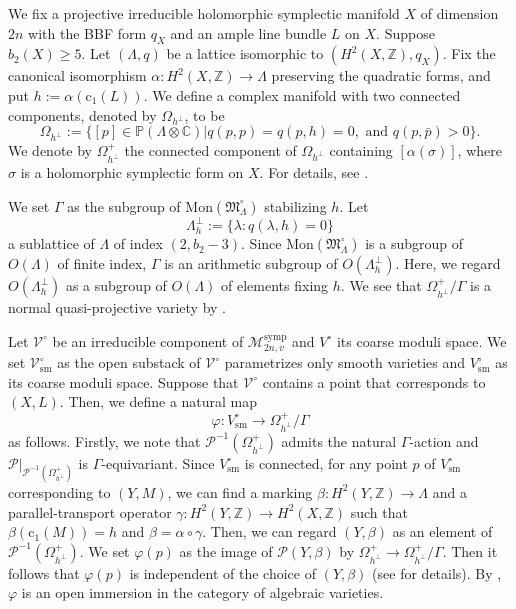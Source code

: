 \documentclass[12pt,twoside]{amsart}
\theoremstyle{definition}
\begin{document}
 We fix a projective irreducible holomorphic symplectic manifold $X$ of dimension $2n$ with the BBF form $q_X$ and an ample line bundle $L$ on $X$. 
 Suppose $b_2(X)\ge 5$.
Let $(\Lambda,q)$ be a lattice isomorphic to $(H^2(X,\mathbb{Z}),q_X)$. 
Fix the canonical isomorphism $\alpha\colon H^2(X,\mathbb{Z})\to \Lambda$ preserving the quadratic forms, and put $h:=\alpha(\mathrm{c}_1(L))$.
We define a complex manifold with two connected components, denoted by $\Omega_{h^{\perp}}$, to be
\[
\Omega_{h^{\perp}}:=\{[p]\in\mathbb{P}(\Lambda\otimes\mathbb{C})|q(p,p)=q(p,h)=0, \textrm{ and }q(p,\bar{p})>0\}.
\]
We denote by $\Omega_{h^{\perp}}^+$ the connected component of $\Omega_{h^{\perp}}$ containing $[\alpha(\sigma)]$, where $\sigma$ is a holomorphic symplectic form on $X$.  
For details, see \cite[\S4]{MarkmanSurvey}.
 
We set $\Gamma$ as the subgroup of $\mathrm{Mon}(\mathfrak{M}_{\Lambda}^\circ)$ stabilizing $h$. 
 Let 
 \[
 \Lambda_h^\perp:=\{\lambda: q(\lambda,h)=0\}
 \]
 a sublattice of $\Lambda$ of index $(2,b_2-3)$.
 Since $\mathrm{Mon}(\mathfrak{M}_{\Lambda}^\circ)$ is a subgroup of $O(\Lambda)$ of finite index, $\Gamma$ is an arithmetic subgroup of $O(\Lambda_h^\perp)$.
 Here, we regard $O(\Lambda_h^\perp)$ as a subgroup of $O(\Lambda)$ of elements fixing $h$.
 We see that $\Omega_{h^{\perp}}^+/\Gamma$ is a normal quasi-projective variety by \cite{BB}. 
 
Let $\mathcal{V}^\circ$ be an irreducible component of $\mathcal{M}^{\mathrm{symp}}_{2n,v}$ and $V^\circ$ its coarse moduli space.
We set $\mathcal{V}^\circ_{\mathrm{sm}}$ as the open substack of $\mathcal{V}^\circ$ parametrizes only smooth varieties and $V^\circ_{\mathrm{sm}}$ as its coarse moduli space.
Suppose that $\mathcal{V}^\circ$ contains a point that corresponds to $(X,L)$.
 Then, we define a natural map 
 \[
\varphi\colon V^\circ_{\mathrm{sm}}\to \Omega_{h^{\perp}}^+/\Gamma
 \]
as follows.  Firstly, we note that $\mathcal{P}^{-1}(\Omega_{h^\perp}^+)$ admits the natural $\Gamma$-action and $\mathcal{P}|_{\mathcal{P}^{-1}(\Omega_{h^\perp}^+)}$ is $\Gamma$-equivariant.
 Since $V^\circ_{\mathrm{sm}}$ is connected, for any point $p$ of $V^\circ_{\mathrm{sm}}$ corresponding to $(Y,M)$, we can find a marking $\beta\colon H^2(Y,\mathbb{Z})\to \Lambda$ and a parallel-transport operator $\gamma\colon H^2(Y,\mathbb{Z})\to H^2(X,\mathbb{Z})$ such that $\beta(\mathrm{c}_1(M))=h$ and $\beta=\alpha \circ \gamma$.
 Then, we can regard $(Y,\beta)$ as an element of $\mathcal{P}^{-1}(\Omega_{h^\perp}^+)$. 
 We set $\varphi(p)$ as the image of $\mathcal{P}(Y,\beta)$ by $\Omega_{h^{\perp}}^+\to\Omega_{h^{\perp}}^+/\Gamma$.
 Then it follows that $\varphi(p)$ is independent of the choice of $(Y,\beta)$ (see \cite[Section 8]{MarkmanSurvey} for details). 
 By \cite[Theorem 8.4]{MarkmanSurvey}, $\varphi$ is an open immersion in the category of algebraic varieties.
\end{document}
